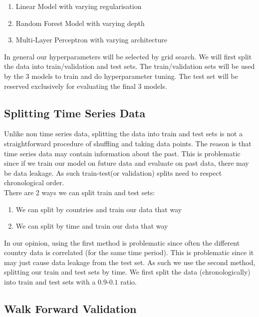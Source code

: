 \documentclass{article}
\begin{document}
\begin{enumerate}
\item Linear Model with varying regularisation
\item Random Forest Model with varying depth
\item Multi-Layer Perceptron with varying architecture
\end{enumerate}

In general our hyperparameters will be selected by grid search. We will first split the data into train/validation and test sets. The train/validation sets will be used by the 3 models to train and do hyperparameter tuning. The test set will be reserved exclusively for evaluating the final 3 models.\\

\subsection{Splitting Time Series Data}

Unlike non time series data, splitting the data into train and test sets is not a straightforward procedure of shuffling and taking data points. The reason is that time series data may contain information about the past. This is problematic since if we train our model on future data and evaluate on past data, there may be data leakage. As such train-test(or validation) splits need to respect chronological order. \\

There are 2 ways we can split train and test sets:

\begin{enumerate}
\item We can split by countries and train our data that way
\item We can split by time and train our data that way
\end{enumerate}

In our opinion, using the first method is problematic  since often the different country data is correlated (for the same time period). This is problematic since it may just cause data leakage from the test set. As such we use the second method, splitting our train and test sets by time. We first split the data (chronologically) into train and test sets with a $0.9$-$0.1$ ratio. 

\subsection{Walk Forward Validation}
\end{document}
